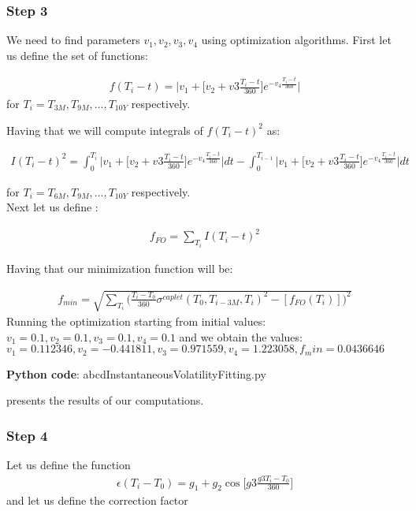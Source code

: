 \documentclass[11pt]{article}
\numberwithin{equation}{subsection}
\begin{document}
\subsubsection*{Step 3}
We need to find parameters \(v_1, v_2, v_3, v_4\) using optimization algorithms. First let us define
the set of functions:

\begin{eqnarray*}
	f(T_i - t) = \mathrel{\bigg|} v_1 + \bigg[v_2 + v3 \frac{T_i-t}{360}\bigg] e^{-v_4 \frac{T_i-t}{360}} \mathrel{\bigg|}
\end{eqnarray*}
for \(T_i = T_{3M}, T_{9M},..., T_{10Y}\) respectively.

Having that we will compute integrals of \(f(T_i - t)^2\) as:

\begin{eqnarray*}
	I(T_i - t)^2 = \int_{0}^{T_i} \mathrel{\bigg|} v_1 + \bigg[v_2 + v3 \frac{T_i-t}{360}\bigg] e^{-v_4 \frac{T_i-t}{360}} \mathrel{\Bigg|} dt
	- \int_{0}^{T_{i-1}} \mathrel{\Bigg|} v_1 + \bigg[v_2 + v3 \frac{T_i-t}{360}\bigg] e^{-v_4 \frac{T_i-t}{360}} \mathrel{\bigg|} dt
\end{eqnarray*}

for \(T_i = T_{6M}, T_{9M},..., T_{10Y}\) respectively.\\
Next let us define :

\begin{eqnarray*}
	f_{FO} = \sum_{T_i} I(T_i - t)^2
\end{eqnarray*}

Having that our minimization function will be:

\begin{eqnarray*}
	f_{min} = \sqrt{\sum_{T_i}\bigg(\frac{T_i-T_0}{360} \sigma^{caplet}(T_0, T_{i-3M}, T_i)^2 - [f_{FO}(T_i)]\bigg)^2}
\end{eqnarray*}
Running the optimization starting from initial values: \(v_1=0.1, v_2=0.1, v_3=0.1, v_4=0.1\) and 
we obtain the values: \(v_1=0.112346, v_2=-0.441811, v_3=0.971559, v_4=1.223058, f_min=0.0436646\) 

\textbf{Python code}: abcdInstantaneousVolatilityFitting.py

presents the results of our computations.

\subsubsection*{Step 4}
Let us define the function
\begin{eqnarray*}
	\epsilon(T_i-T_0) = g_1 + g_2 \cos\bigg[g3\frac{g3 T_i-T_0}{360} \bigg]
\end{eqnarray*}
and let us define the correction factor 
\end{document}
